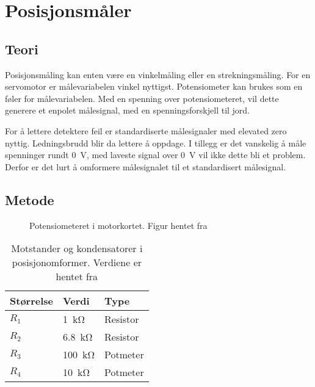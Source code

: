 \section{Posisjonsmåler}
\label{sec:pos_måler}

\subsection{Teori}



Posisjonsmåling kan enten være en vinkelmåling eller en strekningsmåling. For en servomotor er målevariabelen vinkel nyttigst. Potensiometer kan brukes som en føler for målevariabelen. Med en spenning over potensiometeret, vil dette generere et enpolet målesignal, med en spenningsforskjell til jord.

For å lettere detektere feil er standardiserte målesignaler med elevated zero nyttig. Ledningsbrudd blir da lettere å oppdage. I tillegg er det vanskelig å måle spenninger rundt \SI{0}{\volt}, med laveste signal over \SI{0}{\volt} vil ikke dette bli et problem. Derfor er det lurt å omformere målesignalet til et standardisert målesignal.






\subsection{Metode}

\begin{figure}[h]
    \centering
    
    \caption{Potensiometeret i motorkortet. Figur hentet fra \cite{AnalogMotorlabbOppgaver}}
    \label{fig:posisjon_maler_potmeter}
\end{figure}

\begin{table}[h]
    \centering
    \caption{Motstander og kondensatorer i posisjonomformer. Verdiene er hentet fra \cite{AnalogMotorlabbOppgaver}}
    \begin{tabular}{lll}
        \toprule
        Størrelse & Verdi & Type \\
		\midrule
        $R_1$ & \SI{1}{\kilo\ohm} & Resistor\\
        $R_2$ & \SI{6.8}{\kilo\ohm} & Resistor \\
        $R_3$ & \SI{100}{\kilo\ohm} & Potmeter \\
        $R_4$ & \SI{10}{\kilo\ohm} & Potmeter \\
        \bottomrule
    \end{tabular}
    \label{tab:Komponenter_i_posisjonsmaler}
\end{table}


